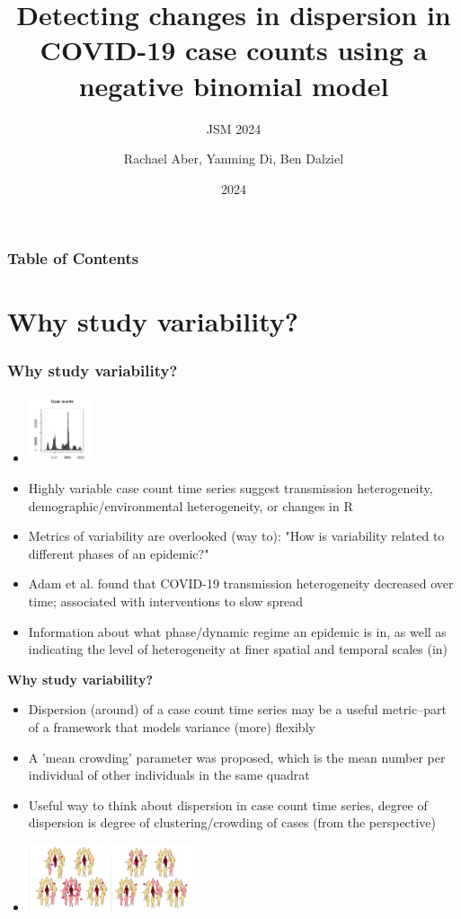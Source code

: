 \documentclass{beamer}
\title{\textbf{Detecting changes in dispersion in COVID-19 case counts using a negative binomial model}}
\subtitle{JSM 2024}
\author{Rachael Aber, Yanming Di, Ben Dalziel}
\date{2024}
\begin{document}
\frame{\titlepage}

\begin{frame}
	\frametitle{Table of Contents}
	\tableofcontents
\end{frame}

\section{Why study variability?}
	
\begin{frame}
\frametitle{Why study variability?}
\begin{itemize}[<+-| alert@+>] %
			\item\includegraphics[height=2cm]{var}
			\item Highly variable case count time series suggest transmission heterogeneity, demographic/environmental heterogeneity, or changes in R
			\item Metrics of variability are overlooked (way to): "How is variability related to different phases of an epidemic?"\cite{graham_measles_2019}
			\item Adam et al.\cite{adam_time-varying_2022} found that COVID-19 transmission heterogeneity decreased over time; associated with interventions to slow spread
			\item Information about what phase/dynamic regime an epidemic is in, as well as indicating the level of heterogeneity at finer spatial and temporal scales (in)
	\end{itemize}
\end{frame}

\begin{frame}{\textbf{Why study variability?}}
	\begin{itemize}[<+-| alert@+>] 
		\item Dispersion (around) of a case count time series may be a useful metric--part of a framework that models variance (more) flexibly
		\item A 'mean crowding' parameter \cite{lloyd_mean_1967} was proposed, which is the mean number per individual of other individuals in the same quadrat 
		\item Useful way to think about dispersion in case count time series, degree of dispersion is degree of clustering/crowding of cases (from the perspective)
		\item \includegraphics[height=2cm]{sup}
	\end{itemize}
\end{frame}
\end{document}
